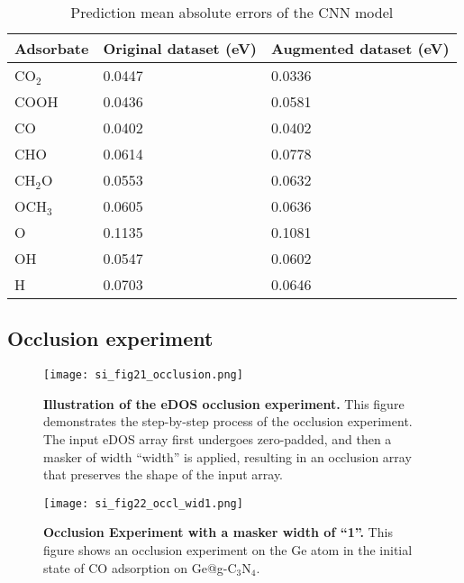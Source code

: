 \begin{table}[h]
  \centering
  \begin{tabular}{lll}
    \hline
    \textbf{Adsorbate} & \textbf{Original dataset (eV)} & \textbf{Augmented dataset (eV)} \\
    \hline
    CO$_2$  & 0.0447 & 0.0336 \\
    COOH    & 0.0436 & 0.0581 \\
    CO      & 0.0402 & 0.0402 \\
    CHO     & 0.0614 & 0.0778 \\
    CH$_2$O & 0.0553 & 0.0632 \\
    OCH$_3$ & 0.0605 & 0.0636 \\
    O       & 0.1135 & 0.1081 \\
    OH      & 0.0547 & 0.0602 \\
    H       & 0.0703 & 0.0646 \\
    \hline
  \end{tabular}
  \caption{Prediction mean absolute errors of the CNN model}
  \label{si_table18:cnn_mae}
\end{table}


\subsection{Occlusion experiment}


\begin{figure}
  \centering
  \texttt{[image: si\_fig21\_occlusion.png]}
  \caption{\textbf{Illustration of the eDOS occlusion experiment.}
  This figure demonstrates the step-by-step process of the occlusion experiment.
  The input eDOS array first undergoes zero-padded, and then a masker of width “width” is applied,
  resulting in an occlusion array that preserves the shape of the input array.}
  \label{si_fig21:occlusion}
\end{figure}


\begin{figure}
  \centering
  \texttt{[image: si\_fig22\_occl\_wid1.png]}
  \caption{\textbf{Occlusion Experiment with a masker width of “1”.}
  This figure shows an occlusion experiment on the Ge atom in
  the initial state of CO adsorption on Ge@g-C$_3$N$_4$.}
  \label{si_fig22:occl_wid1}
\end{figure}


